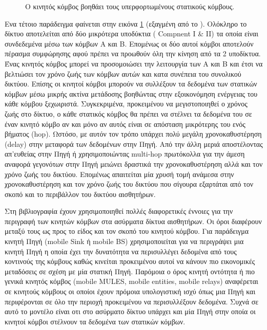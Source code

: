 \begin{itemize}
\begin{figure}[h]
	\caption{O κινητός κόμβος βοηθάει τους υπερφορτωμένους στατικούς κόμβους.}
	\label{fig:mobile_help}
\end{figure}
Ενα τέτοιο παράδειγμα φαίνεται στην εικόνα \ref{fig:mobile_help} (εξαγμένη από το \cite{using_mobile_elements_to_prolong_lefetime}). Ολόκληρο το δίκτυο αποτελείται
από δύο μικρότερα υποδύκτια ( Compnent I \& II) τα οποία είναι συνδεδεμένα μέσω των κόμβων Α και Β. Επομένως οι δύο αυτοί κόμβοι αποτελούν πέρασμα συμφώρησης αφού
πρέπει να προωθούν όλη την κίνηση από τα 2 υποδίκτυα. Ένας κινητός κόμβος μπορεί να προσομοιώσει την λειτουργία των Α και Β και έτσι να βελτιώσει τον χρόνο ζωής των
κόμβων αυτών και κατα συνέπεια του συνολικού δικτύου. Επίσης οι κινητοί κόμβοι μπορούν να συλλέξουν τα δεδομένα των στατικών κόμβων μέσω μικρής ακτίνα μετάδοσης
βοηθώντας στην εξοικονόμηση ενέργειας του κάθε κόμβου ξεχωιριστά. Συγκεκριμένα, προκειμένου να μεγιστοποιηθεί ο χρόνος ζωής στο δίκτυο, ο κάθε στατικός κόμβος θα
πρέπει να στέλνει τα δεδομένα του σε έναν κινητό κόμβο αν και μόνο αν αυτός είναι σε απόσταση μικρότερης του ενός βήματος (hop). Ωστόσο, με αυτόν τον τρόπο υπάρχει
πολύ μεγάλη χρονοκαθυστέρηση (delay) στην μεταφορά των δεδομένων στην Πηγή. Από την άλλη μεριά αποστέλοντας απ'ευθείας στην Πηγή ή χρησιμοποιώντας multi-hop
πρωτόκολλα για την άμεση αναφορά γεγονότων στην Πηγή μειώνει δραστικά την χρονοκαθυστέρηση αλλά και τον χρόνο ζωής του δικτύου. Επομένως απαιτείται μία χρυσή τομή
ανάμεσα στην χρονοκαθυστέρηση και τον χρόνο ζωής του δικτύου που σίγουρα εξαρτάται από τον σκοπό και το περιβάλλον του δικτύου αισθητήρων.
\end{itemize}

Στη βιβλιογραφία έχουν χρησιμοποιηθεί πολλές διαφορετικές έννοιες για την περιγραφή των κινητών κόμβων στα ασύρματα δίκτυα αισθητήρων. Οι όροι διαφέρουν μεταξύ τους
ως προς το είδος και τον σκοπό του κινητού κόμβου. Για παράδειγμα κινητή Πηγή (mobile Sink ή mobile BS) χρησιμοποιείται για να περιγράψει μια κινητή Πηγή η οποία
έχει την δυνατότητα να περισυλλέγει δεδομένα από τους κοντινούς της κόμβους καθώς κινείται προκειμένου αυτοί να κάνουν πιο εικονομικές μεταδόσεις σε σχέση με μία
στατική Πηγή. Παρόμοια ο όρος κινητή οντότητα ή πιο γενικά κινητός κόμβος (mobile MULES, mobile entities, mobile relays) αναφέρεται σε κινητούς κόμβους οι οποίοι
έχουν πρόμοια υπολογιστική ισχύ όπως μια Πηγή και περιφέρονται σε όλο την περιοχή προκειμένου να περισυλλέξουν δεδομένα. Συχνά σε αυτό το μοντέλο είναι οτι
στο ασύρματο δίκτυο υπάρχει και μία Πηγή στην οποία οι κινητοί κόμβοι στέλνουν τα δεδομένα των στατικών κόμβων.

